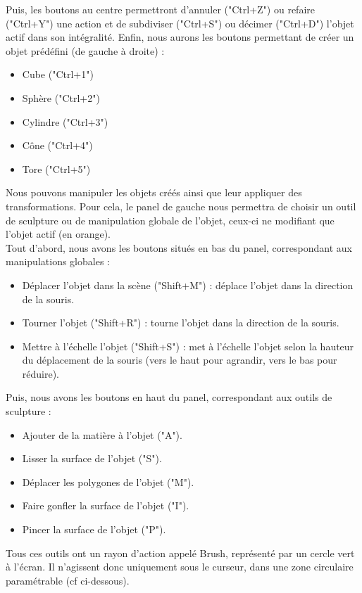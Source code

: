 \documentclass[a4paper]{memoir}
\begin{document}
			Puis, les boutons au centre permettront d'annuler ("Ctrl+Z") ou refaire ("Ctrl+Y") une action et de subdiviser ("Ctrl+S") ou décimer ("Ctrl+D") 
			l'objet actif dans son intégralité.
			Enfin, nous aurons les boutons permettant de créer un objet prédéfini (de gauche à droite) :
			\begin{itemize}
				\item Cube ("Ctrl+1")
				\item Sphère ("Ctrl+2")
				\item Cylindre ("Ctrl+3")
				\item Cône ("Ctrl+4")
				\item Tore ("Ctrl+5")
			\end{itemize}
			Nous pouvons manipuler les objets créés ainsi que leur appliquer des transformations. Pour cela, le panel de gauche nous permettra de choisir un 
			outil de sculpture ou de manipulation globale de l'objet, ceux-ci ne modifiant que l'objet actif (en orange).\\
			Tout d'abord, nous avons les boutons situés en bas du panel, correspondant aux manipulations globales :
			\begin{itemize}
				\item Déplacer l'objet dans la scène ("Shift+M") : déplace l'objet dans la direction de la souris.
				\item Tourner l'objet ("Shift+R") : tourne l'objet dans la direction de la souris.
				\item Mettre à l'échelle l'objet ("Shift+S") : met à l'échelle l'objet selon la hauteur du déplacement de la souris (vers le haut pour 
				agrandir, vers le bas pour réduire).
			\end{itemize}
			Puis, nous avons les boutons en haut du panel, correspondant aux outils de sculpture :
			\begin{itemize}
				\item  Ajouter de la matière à l'objet ("A").
				\item  Lisser la surface de l'objet ("S"). 
				\item  Déplacer les polygones de l'objet ("M"). 
				\item  Faire gonfler la surface de l'objet ("I"). 
				\item  Pincer la surface de l'objet ("P").
			\end{itemize}
			Tous ces outils ont un rayon d'action appelé Brush, représenté par un cercle vert à l'écran. Il n'agissent donc uniquement sous le curseur, dans 
			une zone circulaire paramétrable (cf ci-dessous).\\
\end{document}
